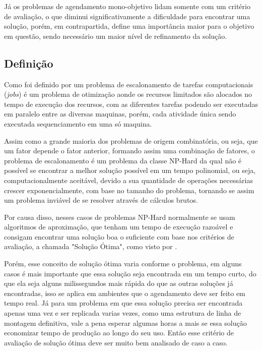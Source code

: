         Já os problemas de agendamento mono-objetivo lidam somente com um critério de avaliação, o que diminui significativamente a dificuldade para encontrar uma solução, porém, em contrapartida, define uma importância maior para o objetivo em questão, sendo necessário um maior nível de refinamento da solução.

    \subsection{Definição}
        Como foi definido por \cite{Bagchi1999} um problema de escalonamento de tarefas computacionais (\textit{jobs}) é um problema de otimização aonde os recursos limitados são alocados no tempo de execução dos recursos, com as diferentes tarefas podendo ser executadas em paralelo entre as diversas maquinas, porém, cada atividade única sendo executada sequenciamento em uma só maquina.\newline

        Assim como a grande maioria dos problemas de origem combinatória, ou seja, que um fator depende o fator anterior, formando assim uma combinação de fatores, o problema de escalonamento é um problema da classe NP-Hard da qual não é possível se encontrar a melhor solução possível em um tempo polinomial, ou seja, computacionalmente aceitável, devido a sua quantidade de operações necessárias crescer exponencialmente, com base no tamanho do problema, tornando se assim um problema inviável de se resolver através de cálculos brutos.\newline

        Por causa disso, nesses casos de problemas NP-Hard normalmente se usam algoritmos de aproximação, que tenham um tempo de execução razoável e consigam encontrar uma solução boa o suficiente com base nos critérios de avaliação, a chamada "Solução Ótima", como visto por \cite{Lawler1993}.\newline

        Porém, esse conceito de solução ótima varia conforme o problema, em alguns casos é mais importante que essa solução seja encontrada em um tempo curto, do que ela seja alguns milissegundos mais rápida do que as outras soluções já encontradas, isso se aplica em ambientes que o agendamento deve ser feito em tempo real.\newline
        Já para um problema em que essa solução precisa ser encontrada apenas uma vez e ser replicada varias vezes, como uma estrutura de linha de montagem definitiva, vale a pena esperar algumas horas a mais se essa solução economizar tempo de produção ao longo do seu uso. Então esse critério de avaliação de solução ótima deve ser muito bem analisado de caso a caso. \newline

